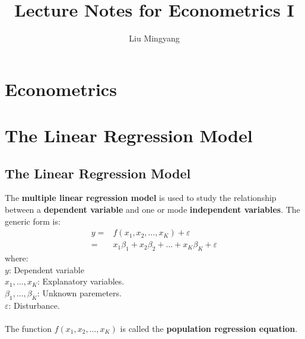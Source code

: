 \documentclass{article}
\title{Lecture Notes for Econometrics I}
\author{Liu Mingyang}
\begin{document}
\onehalfspacing
\maketitle
\tableofcontents

\newpage
\section{Econometrics}
\section{The Linear Regression Model}
\subsection{The Linear Regression Model}
The \textbf{multiple linear regression model} is used to study the relationship between a \textbf{dependent variable} and one or mode \textbf{independent variables}. The generic form is:
	\begin{align*}
		y = &f(x_1, x_2, \ldots, x_K) + \varepsilon\\
		= &x_1\beta_1 + x_2\beta_2 + \ldots + x_K\beta_K + \varepsilon
	\end{align*}
where:\\
\indent $y$: Dependent variable\\
\indent $x_1, \ldots, x_K$: Explanatory variables.\\
\indent $\beta_1, \ldots, \beta_K$: Unknown paremeters.\\
\indent $\varepsilon$: Disturbance.\\\\
The function $f(x_1, x_2, \ldots, x_K)$ is called the \textbf{population regression equation}.
\end{document}
